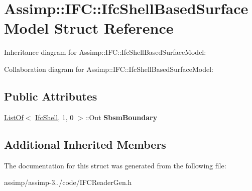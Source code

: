 \hypertarget{struct_assimp_1_1_i_f_c_1_1_ifc_shell_based_surface_model}{\section{Assimp\+:\+:I\+F\+C\+:\+:Ifc\+Shell\+Based\+Surface\+Model Struct Reference}
\label{struct_assimp_1_1_i_f_c_1_1_ifc_shell_based_surface_model}
}


Inheritance diagram for Assimp\+:\+:I\+F\+C\+:\+:Ifc\+Shell\+Based\+Surface\+Model\+:


Collaboration diagram for Assimp\+:\+:I\+F\+C\+:\+:Ifc\+Shell\+Based\+Surface\+Model\+:
\subsection*{Public Attributes}
\begin{DoxyCompactItemize}
\item 
\hypertarget{struct_assimp_1_1_i_f_c_1_1_ifc_shell_based_surface_model_a13ca17c18066175603a09f3e81bd7a93}{\hyperlink{struct_assimp_1_1_s_t_e_p_1_1_list_of}{List\+Of}$<$ \hyperlink{class_assimp_1_1_s_t_e_p_1_1_e_x_p_r_e_s_s_1_1_data_type}{Ifc\+Shell}, 1, 0 $>$\+::Out {\bfseries Sbsm\+Boundary}}\label{struct_assimp_1_1_i_f_c_1_1_ifc_shell_based_surface_model_a13ca17c18066175603a09f3e81bd7a93}

\end{DoxyCompactItemize}
\subsection*{Additional Inherited Members}


The documentation for this struct was generated from the following file\+:\begin{DoxyCompactItemize}
\item 
assimp/assimp-\/3../code/I\+F\+C\+Reader\+Gen.\+h\end{DoxyCompactItemize}
